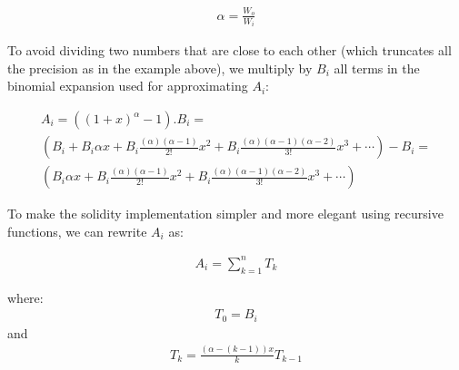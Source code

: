 \documentclass[11pt]{amsart}
\begin{document}
\begin{equation}
\begin{gathered}
\alpha = \frac{W_o}{W_i}
\end{gathered}
\end{equation}

To avoid dividing two numbers that are close to each other (which truncates all the precision as in the example above), we multiply by $B_i$ all terms in the binomial expansion used for approximating $A_i$:


\begin{equation}
\begin{gathered}
A_i=
\left(\left(1+x\right)^{\alpha}-1\right).B_i =
\\
\left(B_i + B_i\alpha x+
B_i\frac{(\alpha)(\alpha-1)}{2!}x^2+
B_i\frac{(\alpha)(\alpha-1)(\alpha-2)}{3!}x^3+
\cdots\right) - B_i =
\\
\left(B_i\alpha x+
B_i\frac{(\alpha)(\alpha-1)}{2!}x^2+
B_i\frac{(\alpha)(\alpha-1)(\alpha-2)}{3!}x^3+
\cdots \right)
\end{gathered}
\end{equation}

To make the solidity implementation simpler and more elegant using recursive functions, we can rewrite $A_i$ as:

\begin{equation}
\begin{gathered}
A_i = \sum_{k=1}^{n}T_k
\end{gathered}
\end{equation}


where:
\begin{equation}
\begin{gathered}
T_0 = B_i
\end{gathered}
\end{equation}
and
\begin{equation}
\begin{gathered}
T_k = \frac{\left(\alpha-(k-1)\right)x}{k} T_{k-1}
\end{gathered}
\end{equation}
\end{document}
